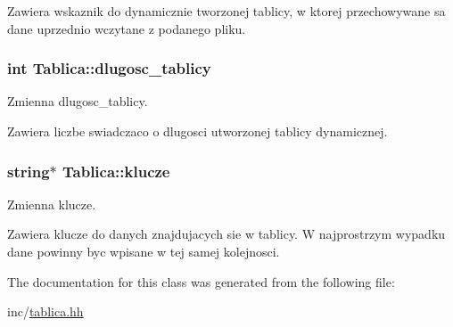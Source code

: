 Zawiera wskaznik do dynamicznie tworzonej tablicy, w ktorej przechowywane sa dane uprzednio wczytane z podanego pliku. \hypertarget{class_tablica_ab0d3e4210dc8a77e0f1c75834084c077}{
\subsubsection[{dlugosc\+\_\+tablicy}]{\setlength{\rightskip}{0pt plus 5cm}int Tablica\+::dlugosc\+\_\+tablicy}}\label{class_tablica_ab0d3e4210dc8a77e0f1c75834084c077}


Zmienna dlugosc\+\_\+tablicy. 

Zawiera liczbe swiadczaco o dlugosci utworzonej tablicy dynamicznej. \hypertarget{class_tablica_a86dbdede5dfd94c3ff34e35213ba4ff2}{
\subsubsection[{klucze}]{\setlength{\rightskip}{0pt plus 5cm}string$\ast$ Tablica\+::klucze}}\label{class_tablica_a86dbdede5dfd94c3ff34e35213ba4ff2}


Zmienna klucze. 

Zawiera klucze do danych znajdujacych sie w tablicy. W najprostrzym wypadku dane powinny byc wpisane w tej samej kolejnosci. 

The documentation for this class was generated from the following file\+:\begin{DoxyCompactItemize}
\item 
inc/\hyperlink{tablica_8hh}{tablica.\+hh}\end{DoxyCompactItemize}
